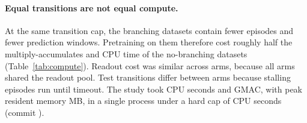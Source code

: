 \begin{table}[t]
\caption{Paired forced-commit contrasts per seed. The minimum effect of interest (\StudyCfgMIE) is applied only to the four contrasts that were registered with it before the study; the others are descriptive (``n/a''). A value of zero at the chance floor is not evidence of equivalence.}
\label{tab:contrasts}
\centering
\small
\resizebox{\linewidth}{!}{}
\end{table}

\paragraph{Equal transitions are not equal compute.}
At the same transition cap, the branching datasets contain fewer episodes and fewer prediction windows. Pretraining on them therefore cost roughly half the multiply-accumulates and CPU time of the no-branching datasets (Table~\ref{tab:compute}). Readout cost was similar across arms, because all arms shared the readout pool. Test transitions differ between arms because stalling episodes run until timeout. The study took \StudyCPUSeconds{} CPU seconds and \StudyTotalGMAC{} GMAC, with peak resident memory \StudyPeakRSSMB{} MB, in a single process under a hard cap of \StudyCfgCPUCap{} CPU seconds (commit \texttt{\StudyCommit}).

\begin{table}[t]
\caption{Compute and test experience per arm (range over seeds). Pretraining uses the same transition cap for branching and no-branching data, but not the same compute.}
\label{tab:compute}
\centering
\small

\end{table}
